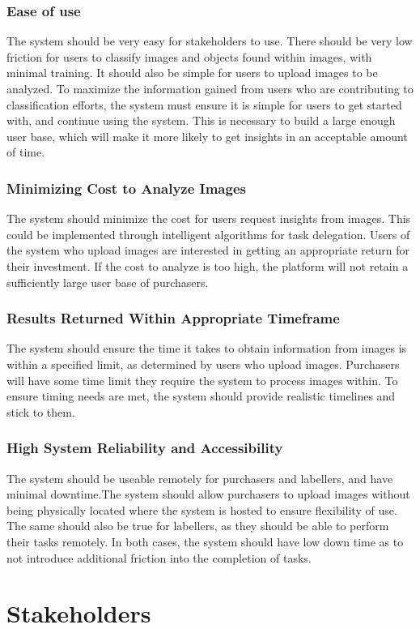 \documentclass[12pt]{article}
\begin{document}
\subsubsection{Ease of use}
The system should be very easy for stakeholders to use. There should be very low friction for users to classify images and objects found
within images, with minimal training. It should also be simple for users to upload images to be analyzed. To maximize the information gained from users who are contributing to classification efforts, the system must ensure it is simple for users to 
get started with, and continue using the system. This is necessary to build a large enough user base, which will make it more likely to get insights in an acceptable 
amount of time.
\subsubsection{Minimizing Cost to Analyze Images}
The system should minimize the cost for users request insights from images. This could be implemented through intelligent algorithms for task delegation. Users of the system who upload images are interested in getting an appropriate return for their investment. If the cost to analyze is too high, the platform will not
retain a sufficiently large user base of purchasers.
\subsubsection{Results Returned Within Appropriate Timeframe}
The system should ensure the time it takes to obtain information from images is within a specified limit, as determined by users who upload images. Purchasers will have some time limit they require the system to process images within. To ensure timing needs are met, the system should provide realistic timelines and stick to them.
\subsubsection{High System Reliability and Accessibility}
The system should be useable remotely for purchasers and labellers, and have minimal downtime.The system should allow purchasers to upload images without being physically located where the system is hosted to ensure flexibility of use. The same should also be true for labellers, as they 
should be able to perform their tasks remotely. In both cases, the system should have low down time as to not introduce additional friction into the completion of tasks.
\section{Stakeholders}
\end{document}
